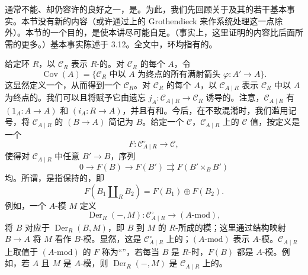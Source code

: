 通常不能、却仍容许的良好之一，是。为此，我们先回顾关于及其的若干基本事实。本节没有新的内容（或许通过上的 Grothendieck 来作系统处理这一点除外）。本节的一个目的，是使本讲尽可能自足。（事实上，这里证明的内容比后面所需的更多。）基本事实陈述于 3.12。全文中，环均指有的。

给定环 $R$，以 $\mathcal C_R$ 表示 $R$-的。对 $\mathcal C_R$ 的每个 $A$，令
\[
\operatorname{Cov}(A)=\{\mathcal C_R\text{ 中以 }A\text{ 为终点的所有满射箭头 }\varphi:A'\to A\}.
\]
这显然定义一个，从而得到一个 $\mathcal C_R$。对 $\mathcal C_R$ 的每个 $A$，以 $\mathcal C_{A\mid R}$ 表示 $\mathcal C_R$ 中以 $A$ 为终点的。我们可以且将赋予它由遗忘 $j_A:\mathcal C_{A\mid R}\to\mathcal C_R$ 诱导的。注意，$\mathcal C_{A\mid R}$ 有 $(1_A:A\to A)$ 和 $(i_A:R\to A)$，并且有和。今后，在不致混淆时，我们滥用记号，将 $\mathcal C_{A\mid R}$ 的 $(B\to A)$ 简记为 $B$。给定一个 $\mathcal C$，$\mathcal C_{A\mid R}$ 上的 $\mathcal C$ 值，按定义是一个
\[F:\mathcal C_{A\mid R}^{\circ}\longrightarrow\mathcal C,\]
使得对 $\mathcal C_{A\mid R}$ 中任意 $B'\to B$，序列
\[
0\longrightarrow F(B)\longrightarrow F(B')\rightrightarrows F(B'\mathbin{\times_B}B')
\]
均。所谓，是指保持的，即
\[F(B_1\mathbin{\amalg_R}B_2)=F(B_1)\oplus F(B_2).\]
例如，一个 $A$-模 $M$ 定义
\[\operatorname{Der}_R(-,M):\mathcal C_{A\mid R}^{\circ}\longrightarrow(A\text{-mod}),\]
将 $B$ 对应于 $\operatorname{Der}_R(B,M)$，即 $B$ 到 $M$ 的 $R$-所成的模；这里通过结构映射 $B\to A$ 将 $M$ 看作 $B$-模。显然，这是 $\mathcal C_{A\mid R}^{\circ}$ 上的；$(A\text{-mod})$ 表示 $A$-模。$\mathcal C_{A\mid R}$ 上取值于 $(A\text{-mod})$ 的 $F$ 称为“”，若每当 $B$ 是 $R$-时，$F(B)$ 都是 $A$-模。例如，若 $A$ 且 $M$ 是 $A$-模，则 $\operatorname{Der}_R(-,M)$ 是 $\mathcal C_{A\mid R}$ 上的。

